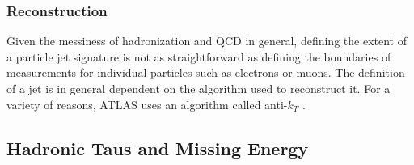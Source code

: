 \subsubsection*{Reconstruction}

Given the messiness of hadronization and QCD in general, defining the extent of a particle jet signature is not as 
straightforward as defining the boundaries of measurements for individual particles such as electrons or muons. The 
definition of a jet is in general dependent on the algorithm used to reconstruct it. For a variety of reasons, ATLAS uses an 
algorithm called anti-$k_T$ \cite{cacciari-antikt}.



\subsection{Hadronic Taus and Missing Energy}